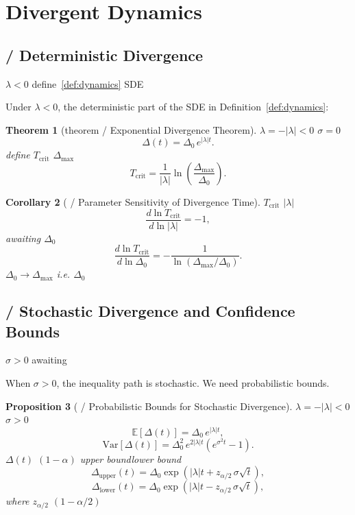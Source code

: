 \documentclass[11pt,a4paper]{article}
\newtheorem{theorem}{Theorem}[section]
\newtheorem{proposition}[theorem]{Proposition}
\newtheorem{corollary}[theorem]{Corollary}
\theoremstyle{remark}
\newcommand{\E}{\mathbb{E}}
\newcommand{\Var}{\mathrm{Var}}
\newcommand{\paren}[1]{\left(#1\right)}
\newcommand{\ineq}{\Delta}
\newcommand{\lambdaparam}{\lambda}
\begin{document}
\section{Divergent Dynamics}

\subsection{ / Deterministic Divergence}

 $\lambdaparam < 0$ define~\ref{def:dynamics}  SDE 

Under $\lambdaparam < 0$, the deterministic part of the SDE in Definition~\ref{def:dynamics}:

\begin{theorem}[theorem / Exponential Divergence Theorem]
\label{thm:divergence}
 $\lambdaparam = -|\lambdaparam| < 0$  $\sigma = 0$
\[
\ineq(t) = \ineq_0 \, e^{|\lambdaparam| t}.
\]
define\textbf{} $T_{\text{crit}}$  $\ineq_{\text{max}}$ 
\[
T_{\text{crit}} = \frac{1}{|\lambdaparam|} \ln\paren{\frac{\ineq_{\text{max}}}{\ineq_0}}.
\]
\end{theorem}

\begin{corollary}[ / Parameter Sensitivity of Divergence Time]
\label{cor:sensitivity}
 $T_{\text{crit}}$  $|\lambdaparam|$ 
\[
\frac{d \ln T_{\text{crit}}}{d \ln |\lambdaparam|} = -1,
\]
awaiting $\ineq_0$ 
\[
\frac{d \ln T_{\text{crit}}}{d \ln \ineq_0} = -\frac{1}{\ln(\ineq_{\text{max}}/\ineq_0)}.
\]
$\ineq_0 \to \ineq_{\text{max}}$
i.e. $\ineq_0$ 
\end{corollary}

\subsection{ / Stochastic Divergence and Confidence Bounds}

 $\sigma > 0$ awaiting

When $\sigma > 0$, the inequality path is stochastic. We need probabilistic bounds.

\begin{proposition}[ / Probabilistic Bounds for Stochastic Divergence]
\label{prop:stoch_bound}
 $\lambdaparam = -|\lambdaparam| < 0$  $\sigma > 0$ 
\[
\E[\ineq(t)] = \ineq_0 \, e^{|\lambdaparam| t},
\]
\[
\Var[\ineq(t)] = \ineq_0^2 \, e^{2|\lambdaparam| t} \paren{e^{\sigma^2 t} - 1}.
\]
$\ineq(t)$  $(1-\alpha)$ upper boundlower bound
\[
\ineq_{\text{upper}}(t) = \ineq_0 \exp\paren{|\lambdaparam| t + z_{\alpha/2} \, \sigma \sqrt{t}},
\]
\[
\ineq_{\text{lower}}(t) = \ineq_0 \exp\paren{|\lambdaparam| t - z_{\alpha/2} \, \sigma \sqrt{t}},
\]
where $z_{\alpha/2}$  $(1-\alpha/2)$ 
\end{proposition}
\end{document}
